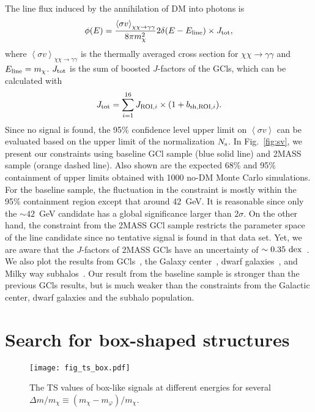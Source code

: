 \documentclass[
	twocolumn,
]{aastex6} %
\begin{document}
The line flux induced by the annihilation of DM into photons is
\begin{equation}
	\phi(E) = \frac{\left< \sigma v \right>_{\chi\chi \to \gamma\gamma}}{8\pi m_\chi^2} 2\delta(E-E_{\rm line}) \times J_{\rm tot},
\end{equation}
where $\left < \sigma v \right>_{\chi\chi \to \gamma\gamma}$ is the thermally averaged cross section for $\chi\chi \to \gamma\gamma$ and $E_{\rm line}= m_\chi$.
$J_{\rm tot}$ is the sum of boosted $J$-factors of the GCls, which can be calculated with
\begin{equation}
	J_{\rm tot} = \sum_{i=1}^{16} J_{{\rm ROI},i}\times (1+b_{{\rm sh,ROI},i}).
\end{equation}
Since no signal is found, the 95\% confidence level upper limit on $\left < \sigma v \right>$ can be evaluated based on the upper limit of the normalization $N_{\rm s}$.
In Fig.~\ref{fig:sv}, we present our constraints using baseline GCl sample (blue solid line) and 2MASS sample (orange dashed line).
Also shown are the expected 68\% and 95\% containment of upper limits obtained with 1000 no-DM Monte Carlo simulations.
For the baseline sample, the fluctuation in the constraint is mostly within the 95\% containment region except that around 42~GeV.
It is reasonable since only the $\sim 42$~GeV candidate has a global significance larger than $2\sigma$.
On the other hand, the constraint from the 2MASS GCl sample restricts the parameter space of the line candidate since no tentative signal is found in that data set.
Yet, we are aware that the $J$-factors of 2MASS GCls have an uncertainty of $\sim 0.35~\rm dex$~\citep{Lisanti2018}.
We also plot the results from GCls~\citep{Liang2016,QuincyAdams2016}, the Galaxy center~\citep{Ackermann2015}, dwarf galaxies~\citep{Liang2016b}, and Milky way subhalos~\citep{Liang2017}.
Our result from the baseline sample is stronger than the previous GCls results, but is much weaker than the constraints from the Galactic center, dwarf galaxies and the subhalo population.

\section{Search for box-shaped structures}\label{sec::box_search}

\begin{figure}
	\centering
	\texttt{[image: fig\_ts\_box.pdf]}
    \caption{\label{fig:ts_box}
		The TS values of box-like signals at different energies for several $\Delta m/m_\chi \equiv (m_\chi - m_\varphi)/m_\chi$.
	}
\end{figure}
\end{document}
